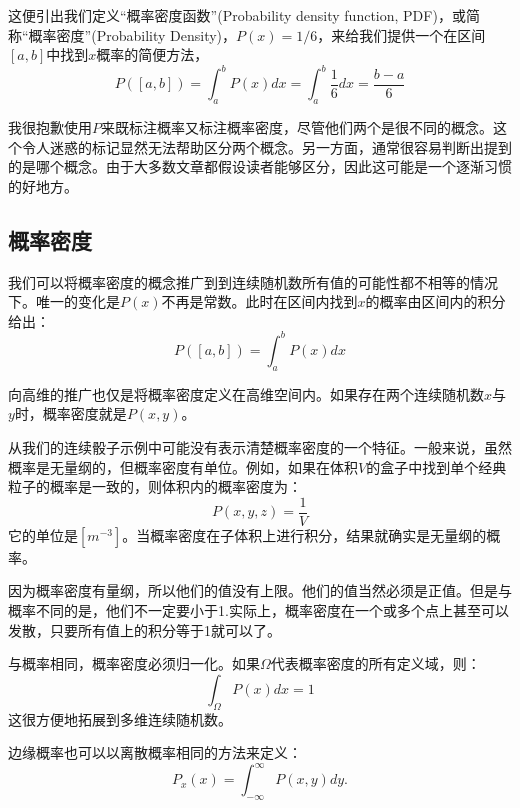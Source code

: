 \documentclass[UTF8]{ctexart}
\numberwithin{equation}{section}%
\numberwithin{figure}{section}%
\begin{document}
    这便引出我们定义“概率密度函数”(Probability density function, PDF)，或简称“概率密度”(Probability Density)，$P(x)=1/6$，来给我们提供一个在区间$[a,b]$中找到$x$概率的简便方法，
    \begin{equation}
        P([a, b])=\int_{a}^{b} P(x) d x=\int_{a}^{b} \frac{1}{6} d x=\frac{b-a}{6}
    \end{equation}
    \begin{mdframed}[backgroundcolor=lightgray,hidealllines=true]
    我很抱歉使用$P$来既标注概率又标注概率密度，尽管他们两个是很不同的概念。这个令人迷惑的标记显然无法帮助区分两个概念。另一方面，通常很容易判断出提到的是哪个概念。由于大多数文章都假设读者能够区分，因此这可能是一个逐渐习惯的好地方。
    \end{mdframed}
    \subsection{概率密度}\label{sec5.2}
    我们可以将概率密度的概念推广到到连续随机数所有值的可能性都不相等的情况下。唯一的变化是$P(x)$不再是常数。此时在区间内找到$x$的概率由区间内的积分给出：
    \begin{equation}
        P([a, b])=\int_{a}^{b} P(x) d x
    \end{equation}

    向高维的推广也仅是将概率密度定义在高维空间内。如果存在两个连续随机数$x$与$y$时，概率密度就是$P(x,y)$。

    从我们的连续骰子示例中可能没有表示清楚概率密度的一个特征。一般来说，虽然概率是无量纲的，但概率密度有单位。例如，如果在体积$V$的盒子中找到单个经典粒子的概率是一致的，则体积内的概率密度为：
    \begin{equation}
        P(x, y, z)=\frac{1}{V}
    \end{equation}
    它的单位是$[m^{-3}]$。当概率密度在子体积上进行积分，结果就确实是无量纲的概率。
    
    因为概率密度有量纲，所以他们的值没有上限。他们的值当然必须是正值。但是与概率不同的是，他们不一定要小于1.实际上，概率密度在一个或多个点上甚至可以发散，只要所有值上的积分等于1就可以了。

    与概率相同，概率密度必须归一化。如果$\Omega$代表概率密度的所有定义域，则：
    \begin{equation}\label{eq5.6}
        \int_{\Omega} P(x) d x=1
    \end{equation}
    这很方便地拓展到多维连续随机数。

    边缘概率也可以以离散概率相同的方法来定义：
    \begin{equation}
        P_{x}(x)=\int_{-\infty}^{\infty} P(x, y) d y .
    \end{equation}
\end{document}
